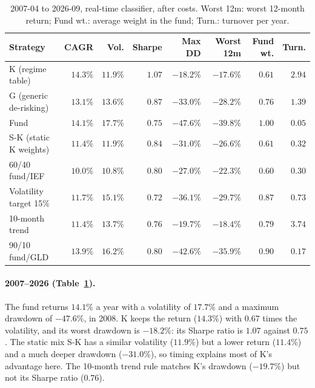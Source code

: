 \documentclass[11pt,a4paper]{article}
\begin{document}
\begin{table}[htbp]
\centering
\caption{2007-04 to 2026-09, real-time classifier, after costs. Worst 12m: worst 12-month return; Fund wt.:
average weight in the fund; Turn.: turnover per year.}
\label{tab:p1}
\small
\setlength{\tabcolsep}{4pt}
\begin{tabular}{@{}lrrrrrrr@{}}
\toprule
Strategy & CAGR & Vol. & Sharpe & Max DD & Worst 12m & Fund wt. & Turn. \\
\midrule
K (regime table) & $14.3\%$ & $11.9\%$ & $1.07$ & $-18.2\%$ & $-17.6\%$ & $0.61$ & $2.94$ \\
G (generic de-risking) & $13.1\%$ & $13.6\%$ & $0.87$ & $-33.0\%$ & $-28.2\%$ & $0.76$ & $1.39$ \\
Fund & $14.1\%$ & $17.7\%$ & $0.75$ & $-47.6\%$ & $-39.8\%$ & $1.00$ & $0.05$ \\
S-K (static K weights) & $11.4\%$ & $11.9\%$ & $0.84$ & $-31.0\%$ & $-26.6\%$ & $0.61$ & $0.32$ \\
60/40 fund/IEF & $10.0\%$ & $10.8\%$ & $0.80$ & $-27.0\%$ & $-22.3\%$ & $0.60$ & $0.30$ \\
Volatility target 15\% & $11.7\%$ & $15.1\%$ & $0.72$ & $-36.1\%$ & $-29.7\%$ & $0.87$ & $0.73$ \\
10-month trend & $11.4\%$ & $13.7\%$ & $0.76$ & $-19.7\%$ & $-18.4\%$ & $0.79$ & $3.74$ \\
90/10 fund/GLD & $13.9\%$ & $16.2\%$ & $0.80$ & $-42.6\%$ & $-35.9\%$ & $0.90$ & $0.17$ \\
\bottomrule
\end{tabular}
\end{table}

\paragraph{2007--2026 (Table~\ref{tab:p1}).} The fund returns $14.1\%$ a year with a volatility of
$17.7\%$ and a maximum drawdown of $-47.6\%$, in 2008. K keeps the return ($14.3\%$) with $0.67$
times the volatility, and its worst drawdown is $-18.2\%$: its Sharpe ratio is $1.07$ against $0.75$.
The static mix S-K has a similar volatility ($11.9\%$) but a lower return ($11.4\%$) and a much deeper
drawdown ($-31.0\%$), so timing explains most of K's advantage here. The 10-month trend rule matches K's
drawdown ($-19.7\%$) but not its Sharpe ratio ($0.76$).
\end{document}
